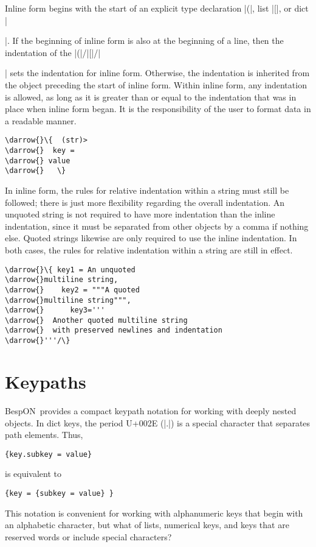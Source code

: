 \documentclass[11pt]{article}
\newcommand{\bespon}{BespON}
\newcommand{\darrow}{\ensuremath{\textcolor{DarkGreen}{\downarrow}}}
\begin{document}
Inline form begins with the start of an explicit type declaration |(|, list |[|, or dict |{|.  If the beginning of inline form is also at the beginning of a line, then the indentation of the |(|/|[|/|{| sets the indentation for inline form.  Otherwise, the indentation is inherited from the object preceding the start of inline form.  Within inline form, any indentation is allowed, as long as it is greater than or equal to the indentation that was in place when inline form began.  It is the responsibility of the user to format data in a readable manner.
\begin{Verbatim}[commandchars=\\\{\}]
\darrow{}\{  (str)>
\darrow{}  key = 
\darrow{} value
\darrow{}   \}
\end{Verbatim}

In inline form, the rules for relative indentation within a string must still be followed; there is just more flexibility regarding the overall indentation.  An unquoted string is not required to have more indentation than the inline indentation, since it must be separated from other objects by a comma if nothing else.  Quoted strings likewise are only required to use the inline indentation.  In both cases, the rules for relative indentation within a string are still in effect.
\begin{Verbatim}[commandchars=\\\{\}]
\darrow{}\{ key1 = An unquoted
\darrow{}multiline string,
\darrow{}    key2 = """A quoted
\darrow{}multiline string""",
\darrow{}      key3='''
\darrow{}  Another quoted multiline string
\darrow{}  with preserved newlines and indentation
\darrow{}'''/\}
\end{Verbatim}




\section{Keypaths}
\label{sec:keypath}

\bespon\ provides a compact keypath notation for working with deeply nested objects.  In dict keys, the period U+002E (|.|) is a special character that separates path elements.  Thus,
\begin{Verbatim}
{key.subkey = value}
\end{Verbatim}
is equivalent to
\begin{Verbatim}
{key = {subkey = value} }
\end{Verbatim}

This notation is convenient for working with alphanumeric keys that begin with an alphabetic character, but what of lists, numerical keys, and keys that are reserved words or include special characters?

}}
\end{document}
